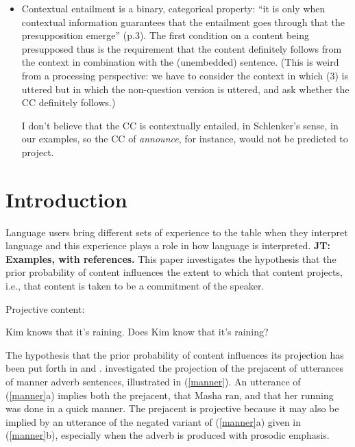 \documentclass[11pt,fleqn]{article}
\newcommand{\6}{\mbox{$[\hspace*{-.6mm}[$}}
\newcommand{\9}{\mbox{$]\hspace*{-.6mm}]$}}
\newcommand{\jt}[1]{\textbf{\color{blue}JT: #1}}
\begin{document}
\begin{itemize}
\begin{itemize}
\item Contextual entailment is a binary, categorical property: ``it is only when contextual information guarantees that the entailment goes through that the presupposition emerge'' (p.3). The first condition on a content being presupposed thus is the requirement that the content definitely follows from the context in combination with the (unembedded) sentence. (This is weird from a processing perspective: we have to consider the context in which (3) is uttered but in which the non-question version is uttered, and ask whether the CC definitely follows.) 

I don't believe that the CC is contextually entailed, in Schlenker's sense, in our examples, so the CC of {\em announce}, for instance, would not be predicted to project. 

\end{itemize}

\end{itemize}

\newpage
			
\section{Introduction}\label{s1}

Language users bring different sets of experience to the table when they interpret language and this experience plays a role in how language is interpreted. \jt{Examples, with references.} This paper investigates the hypothesis that the prior probability of content influences the extent to which that content projects, i.e., that content is taken to be a commitment of the speaker. 

Projective content:

\begin{exe}
\ex\label{know}
\begin{xlist}
\ex Kim knows that it's raining.
\ex Does Kim know that it's raining?
\end{xlist}
\end{exe}

The hypothesis that the prior probability of content influences its projection has been put forth in \citealt{stevens-etal2017} and \citealt{tbd-variability}. \citealt{stevens-etal2017} investigated the projection of the prejacent of utterances of manner adverb sentences, illustrated in (\ref{manner}). An utterance of (\ref{manner}a) implies both the prejacent, that Masha ran, and that her running was done in a quick manner. The prejacent is projective because it may also be implied by an utterance of the negated variant of (\ref{manner}a) given in (\ref{manner}b), especially when the adverb is produced with prosodic emphasis. 
\end{document}
